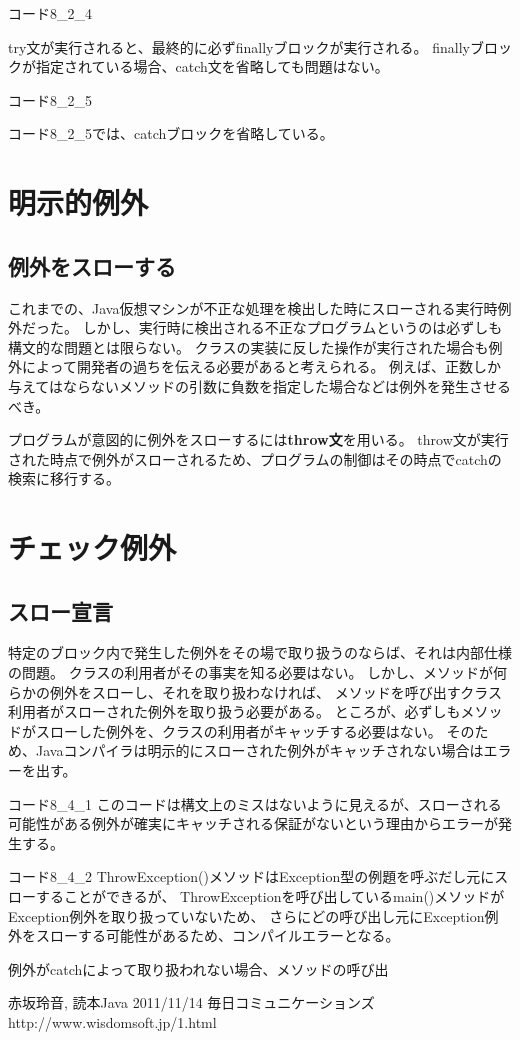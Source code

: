 \documentclass[12pt,a4j,twoside]{jsbook}
\begin{document}
コード8\_2\_4

try文が実行されると、最終的に必ずfinallyブロックが実行される。
finallyブロックが指定されている場合、catch文を省略しても問題はない。

コード8\_2\_5

コード8\_2\_5では、catchブロックを省略している。

\section{明示的例外}
\subsection{例外をスローする}
これまでの、Java仮想マシンが不正な処理を検出した時にスローされる実行時例外だった。
しかし、実行時に検出される不正なプログラムというのは必ずしも構文的な問題とは限らない。
クラスの実装に反した操作が実行された場合も例外によって開発者の過ちを伝える必要があると考えられる。
例えば、正数しか与えてはならないメソッドの引数に負数を指定した場合などは例外を発生させるべき。

プログラムが意図的に例外をスローするには\textbf{throw文}を用いる。
throw文が実行された時点で例外がスローされるため、プログラムの制御はその時点でcatchの検索に移行する。

\section{チェック例外}
\subsection{スロー宣言}
特定のブロック内で発生した例外をその場で取り扱うのならば、それは内部仕様の問題。
クラスの利用者がその事実を知る必要はない。
しかし、メソッドが何らかの例外をスローし、それを取り扱わなければ、
メソッドを呼び出すクラス利用者がスローされた例外を取り扱う必要がある。
ところが、必ずしもメソッドがスローした例外を、クラスの利用者がキャッチする必要はない。
そのため、Javaコンパイラは明示的にスローされた例外がキャッチされない場合はエラーを出す。

コード8\_4\_1
このコードは構文上のミスはないように見えるが、スローされる可能性がある例外が確実にキャッチされる保証がないという理由からエラーが発生する。


コード8\_4\_2
ThrowException()メソッドはException型の例題を呼ぶだし元にスローすることができるが、
ThrowExceptionを呼び出しているmain()メソッドがException例外を取り扱っていないため、
さらにどの呼び出し元にException例外をスローする可能性があるため、コンパイルエラーとなる。

例外がcatchによって取り扱われない場合、メソッドの呼び出
\begin{thebibliography}{9}



赤坂玲音,
読本Java 2011/11/14 毎日コミュニケーションズ
http://www.wisdomsoft.jp/1.html
\end{thebibliography}
\end{document}
